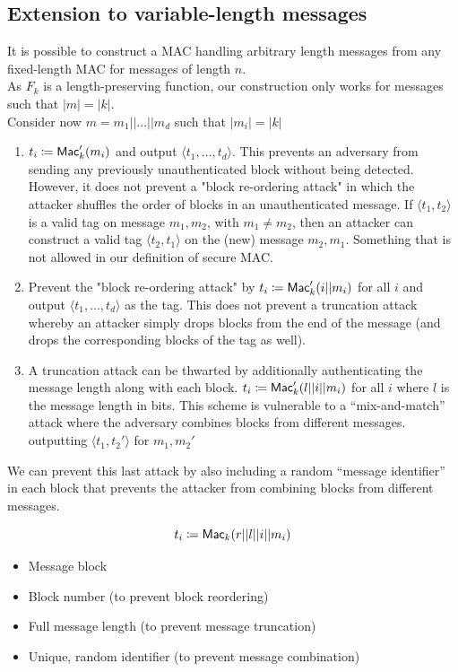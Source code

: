 \documentclass[12pt]{article}
\begin{document}
\subsection{Extension to variable-length messages}
It is possible to construct a MAC handling arbitrary length messages from any fixed-length MAC for messages of length $n$.\\
As $F_k$ is a length-preserving function, our construction only works for messages such that $|m|=|k|$.\\
Consider now $m=m_1||\dots||m_d$ such that $|m_i|=|k|$

\begin{enumerate}
\item $t_i \coloneqq \operatorname{\mathsf{Mac}}_k'(m_i)$ and output $\langle t_1,\dots,t_d\rangle$. This prevents an adversary from sending any previously unauthenticated block without being detected. However, it does not prevent a "block re-ordering attack" in which the attacker shuffles the order of blocks in an unauthenticated message. If $\langle t_1, t_2\rangle$ is a valid tag on message $m_1,m_2$, with $m_1 \neq m_2$, then an attacker can construct a valid tag $\langle t_2, t_1\rangle$ on the (new) message $m_2, m_1$. Something that is not allowed in our definition of secure MAC.

\item Prevent the "block re-ordering attack" by $t_i \coloneqq \operatorname{\mathsf{Mac}}_k'(i||m_i)$ for all $i$ and output $\langle t_1,\dots,t_d\rangle$ as the tag. This does not prevent a truncation attack whereby an attacker simply drops blocks from the end of the message (and drops the corresponding blocks of the tag as well).

\item A truncation attack can be thwarted by additionally authenticating the message length along with each block.  $t_i \coloneqq \operatorname{\mathsf{Mac}}_k'(l||i||m_i)$ for all $i$ where $l$ is the message length in bits. This scheme is vulnerable to a “mix-and-match” attack where the adversary combines blocks from diﬀerent messages. outputting $\langle t_1, t_2' \rangle$ for $m_1, m_2'$
\end{enumerate}

We can prevent this last attack by also including a random “message identifier” in each block that prevents the attacker from combining blocks from diﬀerent messages.

\begin{equation*}
t_i \coloneqq \operatorname{\mathsf{Mac}}_k(r||l||i||m_i)
\end{equation*}
\begin{itemize}
\item Message block
\item Block number (to prevent block reordering)
\item Full message length (to prevent message truncation)
\item Unique, random identifier (to prevent message combination)
\end{itemize}
\end{document}
